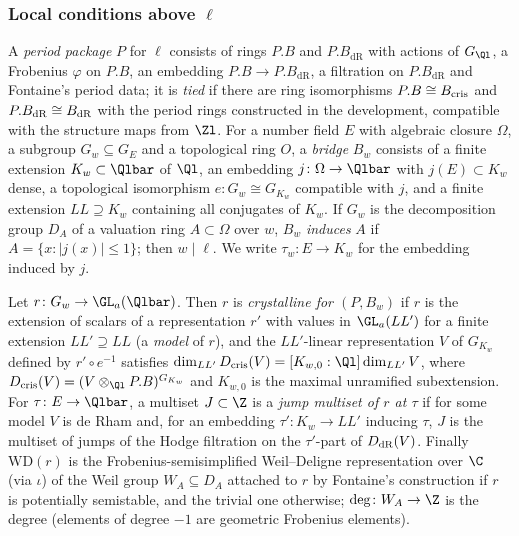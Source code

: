 \subsubsection{Local conditions above $\ell$}\label{sec:pf:steps1:conv:loc}

\begin{definition}\label{pf:steps1:def:package}
A \emph{period package} $P$ for $\ell$ consists of rings $P.B$ and $P.B_{\mathrm{dR}}$ with actions of
$G_{\Ql}$, a Frobenius $\varphi$ on $P.B$, an embedding $P.B\to P.B_{\mathrm{dR}}$, a filtration on
$P.B_{\mathrm{dR}}$ and Fontaine's period data; it is \emph{tied} if there are ring isomorphisms
$P.B\cong B_{\mathrm{cris}}$ and $P.B_{\mathrm{dR}}\cong B_{\mathrm{dR}}$ with the period rings constructed in the
development, compatible with the structure maps from $\Zl$. For a number field $E$ with algebraic
closure $\Omega$, a subgroup $G_w\subseteq G_E$ and a topological ring $O$, a \emph{bridge} $B_w$ consists of
a finite extension $K_w\subset\Qlbar$ of $\Ql$, an embedding $j\colon\Omega\to\Qlbar$ with $j(E)\subset K_w$
dense, a topological isomorphism $e\colon G_w\cong G_{K_w}$ compatible with $j$, and a finite extension
$LL\supseteq K_w$ containing all conjugates of $K_w$. If $G_w$ is the decomposition group $D_A$ of a
valuation ring $A\subset\Omega$ over $w$, $B_w$ \emph{induces} $A$ if $A=\{x:|j(x)|\le1\}$; then $w\mid\ell$.
We write $\tau_w\colon E\to K_w$ for the embedding induced by $j$.
 
 
\end{definition}

\begin{definition}\label{pf:steps1:def:crys}
Let $r\colon G_w\to\GL_a(\Qlbar)$. Then $r$ is \emph{crystalline for $(P,B_w)$} if $r$ is the extension of
scalars of a representation $r'$ with values in $\GL_a(LL')$ for a finite extension $LL'\supseteq LL$ (a
\emph{model} of $r$), and the $LL'$-linear representation $V$ of $G_{K_w}$ defined by $r'\circ e^{-1}$
satisfies $\dim_{LL'}\stepsIDcris(V)=[K_{w,0}:\Ql]\dim_{LL'}V$, where $\stepsIDcris(V)=(V\otimes_{\Ql}P.B)^{G_{K_w}}$
and $K_{w,0}$ is the maximal unramified subextension. For $\tau\colon E\to\Qlbar$, a multiset $J\subset\Z$ is
a \emph{jump multiset of $r$ at $\tau$} if for some model $V$ is de Rham and, for an embedding
$\tau'\colon K_w\to LL'$ inducing $\tau$, $J$ is the multiset of jumps of the Hodge filtration on the
$\tau'$-part of $D_{\mathrm{dR}}(V)$. Finally $\mathrm{WD}(r)$ is the Frobenius-semisimplified Weil--Deligne
representation over $\C$ (via $\iota$) of the Weil group $W_A\subseteq D_A$ attached to $r$ by Fontaine's
construction if $r$ is potentially semistable, and the trivial one otherwise; $\deg\colon W_A\to\Z$ is the
degree (elements of degree $-1$ are geometric Frobenius elements).
  
\end{definition}

